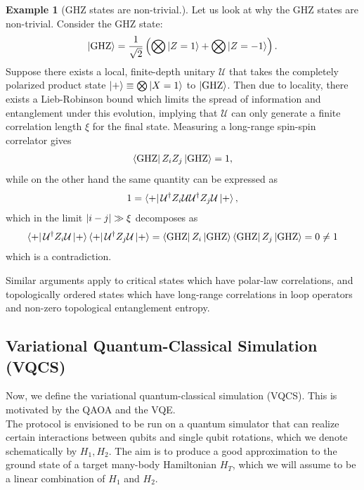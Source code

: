\documentclass{book}
\theoremstyle{definition}
\newtheorem{exmp}{Example}[section]
\newcommand{\f}[2]{\frac{#1}{#2}}
\newcommand{\lp}{\left(}
\newcommand{\rp}{\right)}
\newcommand{\U}{\mathcal{U}}
\begin{document}
\begin{exmp}[GHZ states are non-trivial.]
	
	Let us look at why the GHZ states are non-trivial. Consider the GHZ state:
	\begin{align}
	\ket{\text{GHZ}} = \f{1}{\sqrt{2}}\lp \bigotimes \ket{Z=1} + \bigotimes \ket{Z=-1} \rp.
	\end{align}
	Suppose there exists a local, finite-depth unitary $\U$ that takes the completely polarized product state $\ket{+} \equiv \bigotimes \ket{X=1}$ to $\ket{\text{GHZ}}$. Then due to locality, there exists a Lieb-Robinson bound which limits the spread of information and entanglement under this evolution, implying that $\U$ can  only generate a finite correlation length $\xi$ for the final state.  Measuring a long-range spin-spin correlator gives
	\begin{align}
	\bra{\text{GHZ}} Z_i Z_j \ket{\text{GHZ}} = 1,
	\end{align}
	while on the other hand the same quantity can be expressed as
	\begin{align}
	1 = \bra{+}\U^\dagger Z_i \U \U^\dagger Z_j \U \ket{+} ,
	\end{align}
	which in the limit $\abs{i-j} \gg \xi$ decomposes as
	\begin{align}
	\bra{+}\U^\dagger Z_i \U \ket{+} \bra{+} \U^\dagger Z_j \U \ket{+} = \bra{\text{GHZ}} Z_i \ket{\text{GHZ}} \bra{\text{GHZ}} Z_j \ket{\text{GHZ}} = 0\neq 1
	\end{align}
	which is a contradiction.
\end{exmp} 


Similar arguments apply to critical states which have polar-law correlations, and topologically ordered states which have long-range correlations in loop operators and non-zero topological entanglement entropy. 





 

\subsection{Variational Quantum-Classical Simulation (VQCS)}


Now, we define the variational quantum-classical simulation (VQCS). This is motivated by the QAOA and the VQE. \\


The protocol is envisioned to be run on a quantum simulator that can realize certain interactions between qubits and single qubit rotations, which we denote schematically by $H_1 , H_2$. The aim is to produce a good approximation to the ground state of a target many-body Hamiltonian $H_T$, which we will assume to be a linear combination of $H_1$ and $H_2$. \\
\end{document}
